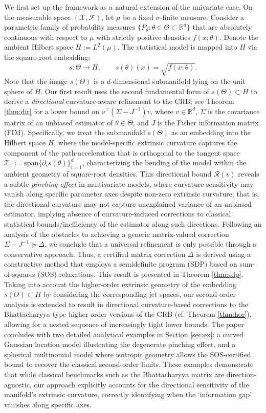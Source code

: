 \documentclass[pdflatex,sn-mathphys-num]{sn-jnl}%
\theoremstyle{thmstyleone}%
\theoremstyle{thmstyletwo}%
\theoremstyle{thmstylethree}%
\begin{document}
We first set up the framework as a natural extension of the univariate case. On the measurable space $(\mathcal X,\mathcal F)$, let $\mu$ be a fixed $\sigma$-finite measure. Consider a parametric family of probability measures $\{P_\theta:\theta\in\Theta\subset\mathbb{R}^d\}$ that are absolutely continuous with respect to \(\mu\) with strictly positive densities $f(x;\theta)$. Denote the ambient Hilbert space \(H := L^2(\mu)\).  The statistical model is mapped into \(H\) via the square-root embedding:
\[
s: \Theta \to H, \qquad s(\theta)(x) = \sqrt{f(x;\theta)}.
\]
Note that the image $s(\Theta)$ is a $d$-dimensional submanifold lying on the unit sphere of $H$.
Our first result uses the second fundamental form of \(s(\Theta)\subset H\) to derive a \emph{directional} curvature-aware refinement to the CRB; see Theorem \ref{thm:dir} for a lower bound on \(v^\top (\Sigma-J^{-1})v\), where \(v\in\mathbb{R}^d\), \(\Sigma\) is the covariance matrix of an unbiased estimator of \(\theta\in\Theta\), and \(J\) is the Fisher information matrix (FIM). Specifically, we treat the submanifold $s(\Theta)$ as an embedding into the Hilbert space $H$, where the model-specific extrinsic curvature captures the component of the path-acceleration that is orthogonal to the tangent space $\mathcal{T}_1:=\mathrm{span}\{\partial_is(\theta)\}_{i=1}^d$, characterizing the bending of the model within the ambient geometry of square-root densities.
This directional bound $\mathcal{R}(v)$ reveals a subtle \textit{pinching effect} in multivariate models, where curvature sensitivity may vanish along specific parameter axes despite non-zero extrinsic curvature; that is, the directional curvature may not capture unexplained variance of an unbiased estimator, implying absence of curvature-induced corrections to classical statistical bounds/inefficiency of the estimator along such directions. Following an analysis of the obstacles to achieving a generic matrix-valued correction \(\Sigma-J^{-1}\succeq \Delta\), we conclude that a universal refinement is only possible through a conservative approach. Thus, a certified matrix correction $\Delta$ is derived using a constructive method that employs a semidefinite program (SDP) based on sum-of-squares (SOS) relaxations. This result is presented in Theorem \ref{thm:sdp}. Taking into account the higher-order extrinsic geometry of the embedding $s(\Theta)\subset H$ by considering the corresponding jet spaces, our second-order analysis is extended to result in directional curvature-based corrections to the Bhattacharyya-type higher-order versions of the CRB (cf. Theorem \ref{thm:hor}), allowing for a nested sequence of increasingly tight lower bounds. The paper concludes with two detailed analytical examples in Section \ref{sec:ex}: a curved Gaussian location model illustrating the degenerate pinching effect, and a spherical multinomial model where isotropic geometry allows the SOS-certified bound to recover the classical second-order limits. These examples demonstrate that while classical benchmarks such as the Bhattacharyya matrix are direction-agnostic, our approach explicitly accounts for the directional sensitivity of the manifold's extrinsic curvature, correctly identifying when the `information gap' vanishes along specific axes.
\end{document}

